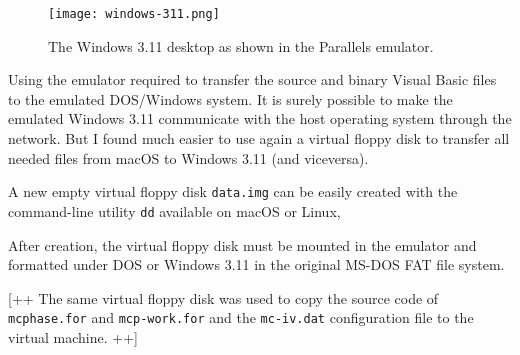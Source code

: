 \begin{figure}[t]
	\centering
	\texttt{[image: windows-311.png]}
	\caption{The Windows 3.11 desktop as shown in the Parallels emulator.}
	\label{fig:windows-311}
\end{figure}



Using the emulator required to transfer the source and binary Visual Basic files to the emulated DOS/Windows system.
It is surely possible to make the emulated Windows 3.11 communicate with the host operating system through the network. But I found much easier to use again a virtual floppy disk to transfer all needed files from macOS to Windows 3.11 (and viceversa).

A new empty virtual floppy disk \texttt{data.img} can be easily created with the command-line utility \texttt{dd} available on macOS or Linux, 



After creation, the virtual floppy disk must be mounted in the emulator and formatted under DOS or Windows 3.11 in the original MS-DOS FAT file system.

[++ The same virtual floppy disk was used to copy the source code of \texttt{mcphase.for} and \texttt{mcp-work.for} and the \texttt{mc-iv.dat} configuration file to the virtual machine. ++]

%

